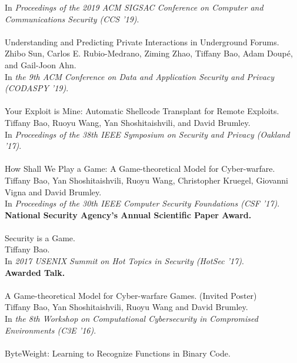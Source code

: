 In \emph{Proceedings of the 2019 ACM SIGSAC Conference on Computer and Communications Security (CCS '19)}.
\\\\
%
Understanding and Predicting Private Interactions in Underground Forums. \\
Zhibo Sun, Carlos E. Rubio-Medrano, Ziming Zhao, Tiffany Bao, Adam Doup\'{e}, and Gail-Joon Ahn.\\
In \emph{the 9th ACM Conference on Data and Application Security and Privacy (CODASPY '19)}.
\\\\
%
Your Exploit is Mine: Automatic Shellcode Transplant for
Remote Exploits.\\
Tiffany Bao, Ruoyu Wang, Yan Shoshitaishvili, and David
Brumley.\\
In \emph{Proceedings of the 38th IEEE Symposium on
Security and Privacy (Oakland '17)}.
\\\\
%
How Shall We Play a Game: A Game-theoretical Model for
Cyber-warfare.\\
Tiffany Bao, Yan Shoshitaishvili, Ruoyu Wang, Christopher Kruegel,
Giovanni Vigna and David Brumley. \\
In \emph{Proceedings of the 30th IEEE Computer Security Foundations
(CSF '17)}. \\
\textbf{National Security Agency's Annual Scientific Paper Award.}
\\\\
%
Security is a Game. \\
Tiffany Bao. \\
In \emph{2017 USENIX Summit on Hot Topics in Security (HotSec '17)}. \\
\textbf{Awarded Talk.}
\\\\
%
A Game-theoretical Model for Cyber-warfare Games. (Invited
Poster)\\
Tiffany Bao, Yan Shoshitaishvili, Ruoyu Wang and David
Brumley. \\
In \emph{the 8th Workshop on Computational Cybersecurity in
Compromised Environments (C3E '16)}.
\\\\
%
ByteWeight: Learning to Recognize Functions in Binary Code.
\\
